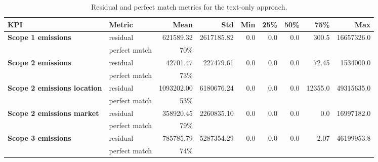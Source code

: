 \documentclass[english, 12pt, a4paper, elec, utf8, a-2b, online]{aaltothesis}
\newcommand{\ra}[1]{\renewcommand{\arraystretch}{#1}}
\begin{document}
\begin{table}\centering
    \ra{1.3}
    \begin{tabular}{@{}llrrrrrrr@{}}\toprule
        \textbf{KPI} & \textbf{Metric} & \textbf{Mean} & \textbf{Std} & \textbf{Min} & \textbf{25\%} & \textbf{50\%} & \textbf{75\%} & \textbf{Max} \\ \midrule
        \textbf{Scope 1 emissions} & residual & 621589.32 & 2617185.82 & 0.0 & 0.0 & 0.0 & 300.5 & 16657326.0 \\
        & perfect match & 70\% & & & & & & \\
        \textbf{Scope 2 emissions} & residual & 42701.47 & 227479.61 & 0.0 & 0.0 & 0.0 & 72.45 & 1534000.0 \\
        & perfect match & 73\% & & & & & & \\
        \textbf{Scope 2 emissions location} & residual & 1093202.00 & 6180676.24 & 0.0 & 0.0 & 0.0 & 12355.0 & 49315635.0 \\
        & perfect match & 53\% & & & & & & \\
        \textbf{Scope 2 emissions market} & residual & 358920.45 & 2260835.10 & 0.0 & 0.0 & 0.0 & 0.0 & 16997182.0 \\
        & perfect match & 79\% & & & & & & \\
        \textbf{Scope 3 emissions} & residual & 785785.79 & 5287354.29 & 0.0 & 0.0 & 0.0 & 2.07 & 46199953.8 \\
        & perfect match & 74\% & & & & & & \\
        \bottomrule
    \end{tabular}
    \caption{Residual and perfect match metrics for the text-only approach.}
    \label{tab:text_only_metrics}
\end{table}

\end{document}
